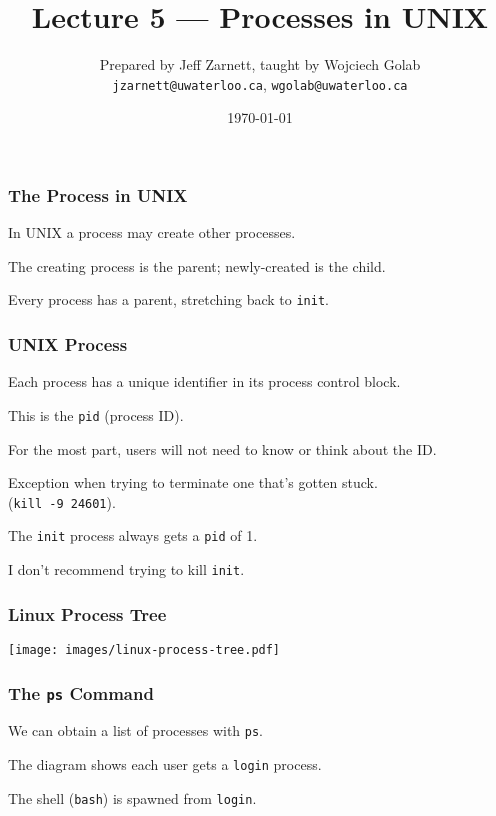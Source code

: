 

\title{Lecture 5 --- Processes in UNIX}

\author{Prepared by Jeff Zarnett, taught by Wojciech Golab \\ \small \texttt{jzarnett@uwaterloo.ca}, \texttt{wgolab@uwaterloo.ca}}
\date{\today}




\begin{frame}
	\titlepage

\end{frame}

\begin{frame}
	\frametitle{The Process in UNIX}

	In UNIX a process may create other processes.

	The creating process is the parent; newly-created is the child.

	Every process has a parent, stretching back to \texttt{init}.

\end{frame}


\begin{frame}
	\frametitle{UNIX Process}
	Each process has a unique identifier in its process control block.

	This is the \texttt{pid} (process ID).

	For the most part, users will not need to know or think about the ID.

	Exception when trying to terminate one that's gotten stuck.\\
	\quad (\texttt{kill -9 24601}).

	The \texttt{init} process always gets a \texttt{pid} of 1.

	I don't recommend trying to kill \texttt{init}.

\end{frame}

\begin{frame}
	\frametitle{Linux Process Tree}

	\begin{center}
		\texttt{[image: images/linux-process-tree.pdf]}
	\end{center}

\end{frame}

\begin{frame}
	\frametitle{The \texttt{ps} Command}

	We can obtain a list of processes with \texttt{ps}.

	The diagram shows each user gets a \texttt{login} process.

	The shell (\texttt{bash}) is spawned from \texttt{login}.

\end{frame}

